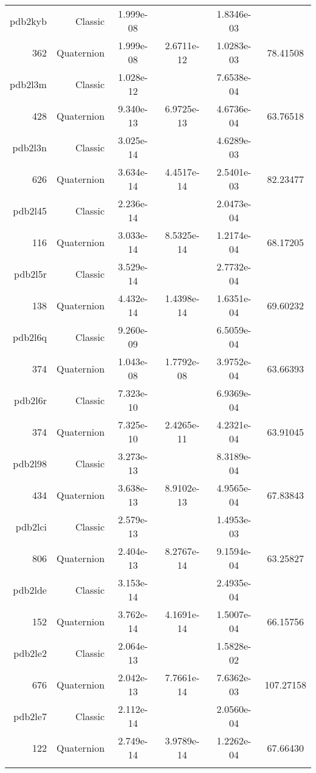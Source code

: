 \begin{xltabular}{\textwidth}{r|rS[table-format=1.3e+2]S[table-format=1.4e+2]S[table-format=1.4e+2]S[table-format=-1.5]}
pdb2kyb & Classic & 1.999e-08 &  & 1.8346e-03 & \\
362 & Quaternion & 1.999e-08 & 2.6711e-12 & 1.0283e-03 & 78.41508\\  \addlinespace
pdb2l3m & Classic & 1.028e-12 &  & 7.6538e-04 & \\
428 & Quaternion & 9.340e-13 & 6.9725e-13 & 4.6736e-04 & 63.76518\\  \addlinespace
pdb2l3n & Classic & 3.025e-14 &  & 4.6289e-03 & \\
626 & Quaternion & 3.634e-14 & 4.4517e-14 & 2.5401e-03 & 82.23477\\  \addlinespace
pdb2l45 & Classic & 2.236e-14 &  & 2.0473e-04 & \\
116 & Quaternion & 3.033e-14 & 8.5325e-14 & 1.2174e-04 & 68.17205\\  \addlinespace
pdb2l5r & Classic & 3.529e-14 &  & 2.7732e-04 & \\
138 & Quaternion & 4.432e-14 & 1.4398e-14 & 1.6351e-04 & 69.60232\\  \addlinespace
pdb2l6q & Classic & 9.260e-09 &  & 6.5059e-04 & \\
374 & Quaternion & 1.043e-08 & 1.7792e-08 & 3.9752e-04 & 63.66393\\  \addlinespace
pdb2l6r & Classic & 7.323e-10 &  & 6.9369e-04 & \\
374 & Quaternion & 7.325e-10 & 2.4265e-11 & 4.2321e-04 & 63.91045\\  \addlinespace
pdb2l98 & Classic & 3.273e-13 &  & 8.3189e-04 & \\
434 & Quaternion & 3.638e-13 & 8.9102e-13 & 4.9565e-04 & 67.83843\\  \addlinespace
pdb2lci & Classic & 2.579e-13 &  & 1.4953e-03 & \\
806 & Quaternion & 2.404e-13 & 8.2767e-14 & 9.1594e-04 & 63.25827\\  \addlinespace
pdb2lde & Classic & 3.153e-14 &  & 2.4935e-04 & \\
152 & Quaternion & 3.762e-14 & 4.1691e-14 & 1.5007e-04 & 66.15756\\  \addlinespace
pdb2le2 & Classic & 2.064e-13 &  & 1.5828e-02 & \\
676 & Quaternion & 2.042e-13 & 7.7661e-14 & 7.6362e-03 & 107.27158\\  \addlinespace
pdb2le7 & Classic & 2.112e-14 &  & 2.0560e-04 & \\
122 & Quaternion & 2.749e-14 & 3.9789e-14 & 1.2262e-04 & 67.66430\\  \addlinespace

\end{xltabular}
